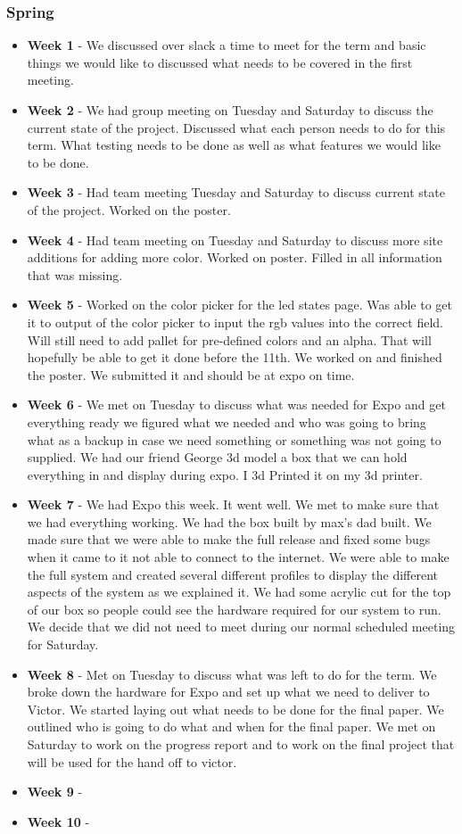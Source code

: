 \documentclass[onecolumn, draftclsnofoot,10pt, compsoc]{IEEEtran}
\begin{document}
			\subsubsection{Spring}
				\begin{itemize}
					\item \textbf{Week 1} - We discussed over slack a time to meet for the term and basic things we would like to discussed what needs to be covered in the first meeting.
					\item \textbf{Week 2} - We had group meeting on Tuesday and Saturday to discuss the current state of the project. Discussed what each person needs to do for this term. What testing needs to be done as well as what features we would like to be done.
					\item \textbf{Week 3} - Had team meeting Tuesday and Saturday to discuss current state of the project. Worked on the poster.
					\item \textbf{Week 4} - Had team meeting on Tuesday and Saturday to discuss more site additions for adding more color.  Worked on poster. Filled in all information that was missing.
					\item \textbf{Week 5} - Worked on the color picker for the led states page. Was able to get it to output of the color picker to input the rgb values into the correct field. Will still need to add pallet for pre-defined colors and an alpha. That will hopefully be able to get it done before the 11th. We worked on and finished the poster. We submitted it and should be at expo on time.
					\item \textbf{Week 6} - We met on Tuesday to discuss what was needed for Expo and get everything ready we figured what we needed and who was going to bring what as a backup in case we need something or something was not going to supplied.  We had our friend George 3d model a box that we can hold everything in and display during expo. I 3d Printed it on my 3d printer.
					\item \textbf{Week 7} - We had Expo this week. It went well. We met to make sure that we had everything working. We had the box built by max's dad built. We made sure that we were able to make the full release  and fixed some bugs when it came to it not able to connect to the internet. We were able to make the full system and created several different profiles to display the different aspects of the system as we explained it. We had some acrylic cut for the top of our box so people could see the hardware required for our system to run. We decide that we did not need to meet during our normal scheduled meeting for Saturday.
					\item \textbf{Week 8} - Met on Tuesday to discuss what was left to do for the term. We broke down the hardware for Expo and set up what we need to deliver to Victor. We started laying out what needs to be done for the final paper. We outlined who is going to do what and when for the final paper. We met on Saturday to work on the progress report and to work on the final project that will be used for the hand off to victor.
					\item \textbf{Week 9} -
					\item \textbf{Week 10} -
				\end{itemize}
\end{document}
